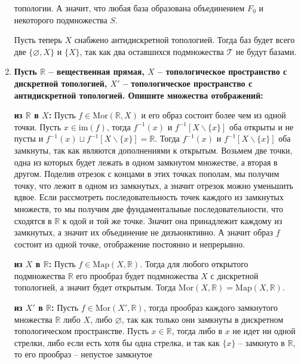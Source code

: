 \documentclass{article}
\begin{document}
\begin{enumerate}
        топологии. А значит, что любая база образована объединением $F_0$ и
        некоторого подмножества $S$.\par
        Пусть теперь $X$ снабжено антидискретной топологией. Тогда баз будет
        всего две $\{\varnothing, X\}$ и $\{X\}$, так как два оставшихся
        подмножества $\mathcal{T}$ не будут базами.
    \item \textbf{Пусть $\mathbb{R}$ – вещественная прямая, $X$ –
        топологическое пространство с дискретной топологией, $X'$ –
        топологическое пространство с антидискретной топологией. Опишите
        множества отображений:}\par
        \textbf{из $\mathbb{R}$ в $X$:} Пусть $f\in\text{Mor}(\mathbb{R}, X)$ и
        его образ состоит более чем из одной точки. Пусть $x\in\text{im}(f)$, 
        тогда $f^{-1}(x)$ и $f^{-1}[X\backslash\{x\}]$ оба открыты и не пусты и
        $f^{-1}(x)\sqcup f^{-1}[X\backslash\{x\}]=\mathbb{R}$. Тогда $f^{-1}(x)$
        и $f^{-1}[X\backslash\{x\}]$ оба замкнуты, так как являются дополнениями
        к открытым. Возьмем две точки, одна из которых будет лежать в одном
        замкнутом множестве, а вторая в другом. Поделив отрезок с концами в
        этих точках пополам, мы получим точку, что лежит в одном из замкнутых,
        а значит отрезок можно уменьшить вдвое. Если рассмотреть
        последовательность точек каждого из замкнутых множеств, то мы получим
        две фундаментальные последовательности, что сходятся в $\mathbb{R}$ к
        одой и той же точке. Значит она принадлежит каждому из замкнутых, а
        значит их объединение не дизъюнктивно. А значит образ $f$ состоит из
        одной точке, отображение постоянно и непрерывно.\par 
        \textbf{из $X$ в $\mathbb{R}$:} Пусть $f \in \text{Map}(X, \mathbb{R})$.
        Тогда для любого открытого подмножества $\mathbb{R}$ его прообраз будет
        подмножества $X$ с дискретной топологией, а значит будет открытым.
        Тогда $\text{Mor}(X, \mathbb{R})=\text{Map}(X, \mathbb{R})$.\par
        \textbf{из $X'$ в $\mathbb{R}$:} Пусть $f\in\text{Mor}(X',
        \mathbb{R})$, тогда прообраз каждого замкнутого множества $\mathbb{R}$
        либо $X$, либо $\varnothing$, так как только они замкнуты в дискретном
        топологическом пространстве. Пусть $x\in\mathbb{R}$, тогда либо в $x$
        не идет ни одной стрелки, либо если есть хотя бы одна стрелка, и так как
        $\{x\}$ – замкнуто в $\mathbb{R}$, то его прообраз – непустое замкнутое

\end{enumerate}
\end{document}
